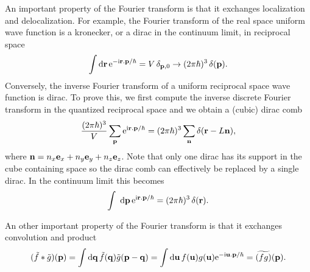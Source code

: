 An important property of the Fourier transform is that it exchanges localization and delocalization. For example, the Fourier transform of the real space uniform wave function is a kronecker, or a dirac in the continuum limit, in reciprocal space
\begin{equation}
	\label{eq:pDirac}
	\int \mathrm{d}\mathbf{ r } \, \mathrm{e}^{ -\mathrm{i}\mathbf{ r }.\mathbf{ p }/\hbar } = V \, \delta_{\mathbf{ p },0}
	\rightarrow (2\pi\hbar)^3 \, \delta(\mathbf{ p }) .
\end{equation}
Conversely, the inverse Fourier transform of a uniform reciprocal space wave function is dirac.
To prove this, we first compute the inverse discrete Fourier transform in the quantized reciprocal space and we obtain a (cubic) dirac comb
\begin{equation}
	\frac{(2\pi\hbar)^3}{V} \sum_{\mathbf{ p }} \mathrm{e}^{\mathrm{i} \mathbf{ r }.\mathbf{ p }/\hbar } =
	(2\pi\hbar)^3 \sum_{\mathbf{ n }} \delta(\mathbf{ r } - L\mathbf{ n }) ,
	\nonumber
\end{equation}
where $\mathbf{ n } = n_x \mathbf{ e }_x  + n_y \mathbf{ e }_y + n_z \mathbf{ e }_z$.
Note that only one dirac has its support in the cube containing space so the dirac comb can effectively be replaced by a single dirac.
In the continuum limit this becomes
\begin{equation}
	\label{eq:rDirac}
	\int \ud\vect{p} \,\expcompl{\vect{r}.\vect{p}/\hbar} =
	(2\pi\hbar)^3 \,\delta(\vect{r}) .
\end{equation}

An other important property of the Fourier transform is that it exchanges convolution and product
\begin{equation}
	\label{eq:convolutionFourier}
	(\tilde{f} \ast \tilde{g})(\mathbf{ p }) = \int \mathrm{d}\mathbf{ q } \, \tilde{f}(\mathbf{ q }) \tilde{g}(\mathbf{ p }-\mathbf{ q }) =
	\int \mathrm{d}\mathbf{ u } \, f(\mathbf{ u }) g(\mathbf{ u }) \mathrm{e}^{ -\mathrm{i}\mathbf{ u }.\mathbf{ p }/\hbar } = \widetilde{(f g)}(\mathbf{ p }) .
\end{equation}

